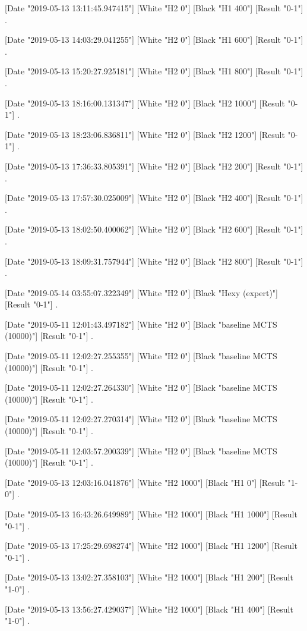 {[Date "2019-05-13 13:11:45.947415"]
[White "H2 0"]
[Black "H1 400"]
[Result "0-1"]
.

[Date "2019-05-13 14:03:29.041255"]
[White "H2 0"]
[Black "H1 600"]
[Result "0-1"]
.

[Date "2019-05-13 15:20:27.925181"]
[White "H2 0"]
[Black "H1 800"]
[Result "0-1"]
.

[Date "2019-05-13 18:16:00.131347"]
[White "H2 0"]
[Black "H2 1000"]
[Result "0-1"]
.

[Date "2019-05-13 18:23:06.836811"]
[White "H2 0"]
[Black "H2 1200"]
[Result "0-1"]
.

[Date "2019-05-13 17:36:33.805391"]
[White "H2 0"]
[Black "H2 200"]
[Result "0-1"]
.

[Date "2019-05-13 17:57:30.025009"]
[White "H2 0"]
[Black "H2 400"]
[Result "0-1"]
.

[Date "2019-05-13 18:02:50.400062"]
[White "H2 0"]
[Black "H2 600"]
[Result "0-1"]
.

[Date "2019-05-13 18:09:31.757944"]
[White "H2 0"]
[Black "H2 800"]
[Result "0-1"]
.

[Date "2019-05-14 03:55:07.322349"]
[White "H2 0"]
[Black "Hexy (expert)"]
[Result "0-1"]
.

[Date "2019-05-11 12:01:43.497182"]
[White "H2 0"]
[Black "baseline MCTS (10000)"]
[Result "0-1"]
.

[Date "2019-05-11 12:02:27.255355"]
[White "H2 0"]
[Black "baseline MCTS (10000)"]
[Result "0-1"]
.

[Date "2019-05-11 12:02:27.264330"]
[White "H2 0"]
[Black "baseline MCTS (10000)"]
[Result "0-1"]
.

[Date "2019-05-11 12:02:27.270314"]
[White "H2 0"]
[Black "baseline MCTS (10000)"]
[Result "0-1"]
.

[Date "2019-05-11 12:03:57.200339"]
[White "H2 0"]
[Black "baseline MCTS (10000)"]
[Result "0-1"]
.

[Date "2019-05-13 12:03:16.041876"]
[White "H2 1000"]
[Black "H1 0"]
[Result "1-0"]
.

[Date "2019-05-13 16:43:26.649989"]
[White "H2 1000"]
[Black "H1 1000"]
[Result "0-1"]
.

[Date "2019-05-13 17:25:29.698274"]
[White "H2 1000"]
[Black "H1 1200"]
[Result "0-1"]
.

[Date "2019-05-13 13:02:27.358103"]
[White "H2 1000"]
[Black "H1 200"]
[Result "1-0"]
.

[Date "2019-05-13 13:56:27.429037"]
[White "H2 1000"]
[Black "H1 400"]
[Result "1-0"]
.

}
